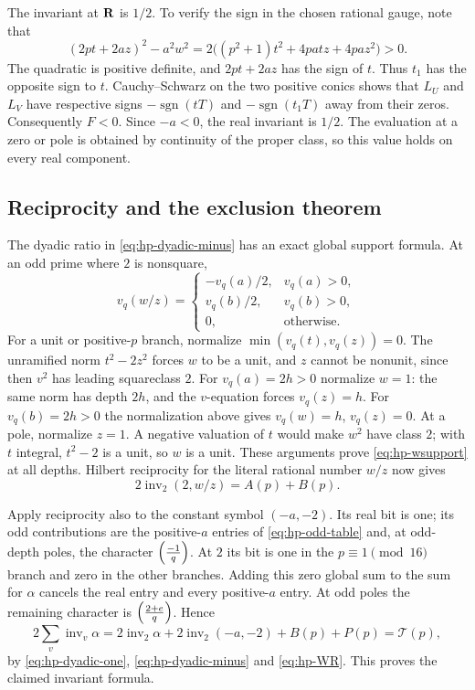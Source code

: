 The invariant at $\mathbf R$ is $1/2$.  To verify the sign in the chosen
rational gauge, note that
\[
 (2pt+2az)^2-a^2w^2
 =2\bigl((p^2+1)t^2+4patz+4paz^2\bigr)>0.
\]
The quadratic is positive definite, and $2pt+2az$ has the sign of $t$.
Thus $t_1$ has the opposite sign to $t$.
Cauchy--Schwarz on the two positive conics shows that $L_U$ and $L_V$
have respective signs $-\operatorname{sgn}(tT)$ and
$-\operatorname{sgn}(t_1T)$ away from their zeros.  Consequently
$F<0$.  Since $-a<0$, the real invariant is $1/2$.
The evaluation at a zero or pole is obtained by continuity of the
proper class, so this value holds on every real component.

\subsection{Reciprocity and the exclusion theorem}

The dyadic ratio in \eqref{eq:hp-dyadic-minus} has an exact global
support formula.  At an odd prime where $2$ is nonsquare,
\begin{equation}\label{eq:hp-wsupport}
 v_q(w/z)=
 \begin{cases}
 -v_q(a)/2,&v_q(a)>0,\\
 v_q(b)/2,&v_q(b)>0,\\
 0,&\text{otherwise}.
 \end{cases}
\end{equation}
For a unit or positive-$p$ branch, normalize $\min(v_q(t),v_q(z))=0$.
The unramified norm $t^2-2z^2$ forces $w$ to be a unit, and $z$
cannot be nonunit, since then $v^2$ has leading squareclass $2$.
For $v_q(a)=2h>0$ normalize $w=1$: the same norm has depth $2h$,
and the $v$-equation forces $v_q(z)=h$.
For $v_q(b)=2h>0$ the normalization above gives $v_q(w)=h$, $v_q(z)=0$.
At a pole, normalize $z=1$.  A negative valuation of $t$ would make
$w^2$ have class $2$; with $t$ integral, $t^2-2$ is a unit, so $w$
is a unit.  These arguments prove \eqref{eq:hp-wsupport} at all depths.
Hilbert reciprocity for the literal rational number $w/z$ now gives
\begin{equation}\label{eq:hp-WR}
 2\operatorname{inv}_2(2,w/z)=A(p)+B(p).
\end{equation}

Apply reciprocity also to the constant symbol $(-a,-2)$.
Its real bit is one; its odd contributions are the positive-$a$
entries of \eqref{eq:hp-odd-table} and, at odd-depth poles, the
character $\left(\frac{-1}{q}\right)$.
At $2$ its bit is one in the $p\equiv1\pmod {16}$ branch and zero
in the other branches.
Adding this zero global sum to the sum for $\alpha$ cancels the real
entry and every positive-$a$ entry.  At odd poles the remaining
character is $\left(\frac{2+e}{q}\right)$.  Hence
\[
 2\sum_v\operatorname{inv}_v\alpha
 =2\operatorname{inv}_2\alpha+
   2\operatorname{inv}_2(-a,-2)+B(p)+P(p)
 =\mathcal T(p),
\]
by \eqref{eq:hp-dyadic-one}, \eqref{eq:hp-dyadic-minus} and
\eqref{eq:hp-WR}.  This proves the claimed invariant formula.

